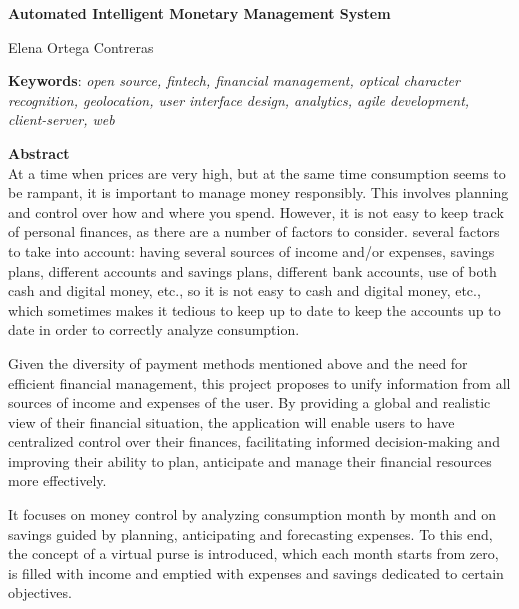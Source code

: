 \cleardoublepage

\begin{center}
{\large\bfseries Automated Intelligent Monetary Management System}\\
\end{center}
\begin{center}
	Elena Ortega Contreras\\
\end{center}
\vspace{0.5cm}
\noindent\textbf{Keywords}: \textit{open source, fintech, financial management, optical character recognition, geolocation, user interface design, analytics, agile development, client-server, web}
\vspace{0.7cm}

\noindent\textbf{Abstract}\\
At a time when prices are very high, but at the same time consumption seems to be rampant, it is important to manage money responsibly. This involves planning and control over how and where you spend. However, it is not easy to keep track of personal finances, as there are a number of factors to consider. several factors to take into account: having several sources of income and/or expenses, savings plans, different accounts and savings plans, different bank accounts, use of both cash and digital money, etc., so it is not easy to cash and digital money, etc., which sometimes makes it tedious to keep up to date to keep the accounts up to date in order to correctly analyze consumption.

Given the diversity of payment methods mentioned above and the need for efficient financial management, this project proposes to unify information from all sources of income and expenses of the user. By providing a global and realistic view of their financial situation, the application will enable users to have centralized control over their finances, facilitating informed decision-making and improving their ability to plan, anticipate and manage their financial resources more effectively.

It focuses on money control by analyzing consumption month by month and on savings guided by planning, anticipating and forecasting expenses. To this end, the concept of a virtual purse is introduced, which each month starts from zero, is filled with income and emptied with expenses and savings dedicated to certain objectives. 

\cleardoublepage

\thispagestyle{empty}

